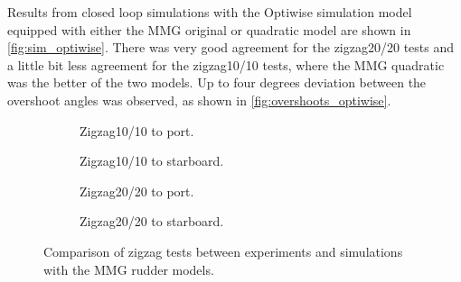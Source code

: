 Results from closed loop simulations with the Optiwise simulation model equipped with either the MMG original or quadratic model are shown in \autoref{fig:sim_optiwise}. There was very good agreement for the zigzag20/20 tests and a little bit less agreement for the zigzag10/10 tests, where the MMG quadratic was the better of the two models. Up to four degrees deviation between the overshoot angles was observed, as shown in \autoref{fig:overshoots_optiwise}.   
\begin{figure}[h]
     \centering
     \begin{subfigure}[b]{0.40\textwidth}
         \centering
         
        \caption{Zigzag10/10 to port.}
        \label{fig:sim_optiwise_10_port}
     \end{subfigure}
     \hfill
     \begin{subfigure}[b]{0.40\textwidth}
         
        \caption{Zigzag10/10 to starboard.}
        \label{fig:sim_optiwise_10_stbd}
     \end{subfigure}
     \vfill
     \begin{subfigure}[b]{0.40\textwidth}
         \centering
         
        \caption{Zigzag20/20 to port.}
        \label{fig:sim_optiwise_20_port}
     \end{subfigure}
     \hfill
     \begin{subfigure}[b]{0.40\textwidth}
         
        \caption{Zigzag20/20 to starboard.}
        \label{fig:sim_optiwise_20_stbd}
     \end{subfigure}
     
        \caption{Comparison of zigzag tests between experiments and simulations with the MMG rudder models.}
        \label{fig:sim_optiwise}
\end{figure}
\vspace{-1cm}


